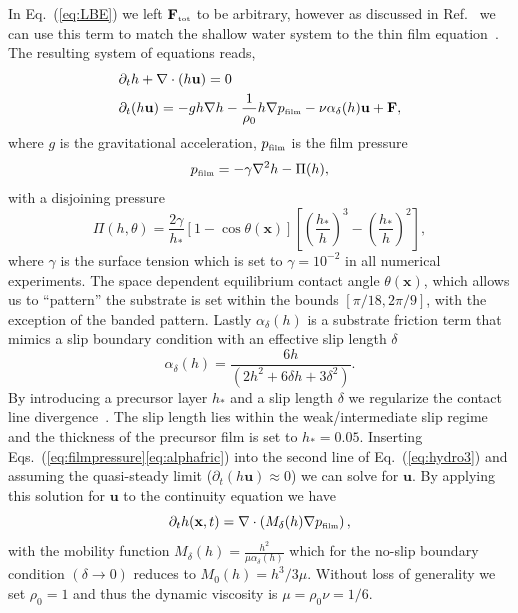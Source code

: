 \documentclass[twoside,twocolumn,9pt]{article}
\begin{document}
In Eq.~(\ref{eq:LBE}) we left $\mathbf{F}_{\mbox{\tiny{tot}}}$ to be arbitrary, however as discussed in Ref.~\cite{zitzLatticeBoltzmannMethod2019} we can use this term to match the shallow water system to the thin film equation~\cite{oronLongscaleEvolutionThin1997, crasterDynamicsStabilityThin2009, bonnWettingSpreading2009}.
The resulting system of equations reads,
\begin{align}\label{eq:hydro3}
    &\partial_t h + \nabla \cdot (h \mathbf{u})  = 0 \nonumber\\ 
    &\partial_t (h \mathbf{u}) = -gh \nabla h -\frac{1}{\rho_0}h\nabla p_{\mbox{\tiny{film}}} - \nu \alpha_{\delta}(h) \mathbf{u} + \mathbf{F},
\end{align}
where $g$ is the gravitational acceleration, $p_{\mbox{\tiny{film}}}$ is the film pressure
\begin{equation}\label{eq:filmpressure}
    p_{\mbox{\tiny{film}}} = - \gamma\nabla^2 h -\Pi(h),
\end{equation}
with a disjoining pressure~\cite{schwartzSimulationDropletMotion1998,nguyenCompetitionCollapseBreakup2012, gonzalezStabilityLiquidRing2013, zitzControllingDewettingMorphologies2023}
\begin{equation}\label{eq:disjoinpressure}
\Pi(h,\theta) = \frac{2\gamma}{h_{\ast}}[1-\cos\theta(\mathbf{x})]\left[\left(\frac{h_*}{h}\right)^3 -\left(\frac{h_*}{h}\right)^2\right],
\end{equation}
where $\gamma$ is the surface tension which is set to $\gamma = 10^{-2}$ in all numerical experiments.
The space dependent equilibrium contact angle $\theta(\mathbf{x})$, which allows us to ``pattern'' the substrate is set within the bounds $[\pi/18, 2\pi/9]$, with the exception of the banded pattern. 
Lastly $\alpha_{\delta}(h)$ is a substrate friction term that mimics a slip boundary condition with an effective slip length $\delta$
\begin{equation}\label{eq:alphafric}
\alpha_{\delta}(h) = \frac{6h}{(2 h^2 + 6 \delta h + 3 \delta^2)}.
\end{equation}
By introducing a precursor layer $h_{\ast}$ and a slip length $\delta$ we regularize the contact line divergence~\cite{huhHydrodynamicModelSteady1971}. 
The slip length lies within the weak/intermediate slip regime~\cite{peschkaSignaturesSlipDewetting2019,fetzerQuantifyingHydrodynamicSlip2007, munchLubricationModelsSmall2005} and the thickness of the precursor film is set to $h_{\ast} = 0.05$.
Inserting Eqs.~(\ref{eq:filmpressure}\ref{eq:alphafric}) into the second line of Eq.~(\ref{eq:hydro3}) and assuming the quasi-steady limit ($\partial_t(h\mathbf{u}) \approx 0$) we can solve for $\mathbf{u}$.
By applying this solution for $\mathbf{u}$ to the continuity equation we have
\begin{equation}\label{eq:thinsolve}
     \partial_t h(\mathbf{x},t) = \nabla\cdot\left(M_{\delta}(h)\nabla p_{\mbox{\tiny{film}}}\right),
\end{equation}
with the mobility function $M_{\delta}(h) = \frac{h^2}{\mu\alpha_{\delta}(h)}$ which for the no-slip boundary condition $(\delta \rightarrow 0)$ reduces to $M_{0}(h) = h^3/3\mu$.
Without loss of generality we set $\rho_0 = 1$ and thus the dynamic viscosity is $\mu = \rho_0 \nu = 1/6$. 
\end{document}
